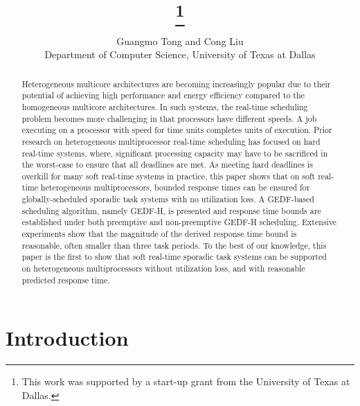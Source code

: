 \documentclass[Times, 10pt,twocolumn]{article}
\theoremstyle{definition}
\begin{document}
  

\title{\protect\vspace{-.5in}{Supporting Soft Real-Time Sporadic Task Systems on Heterogeneous Multiprocessors with No Utilization Loss}\thanks{This work was supported by a start-up
grant from the University of Texas at Dallas.}}
\author{Guangmo Tong and Cong Liu\\
Department of Computer Science, University of Texas at Dallas}

\maketitle
\thispagestyle{empty}



\begin{abstract}

Heterogeneous multicore architectures are becoming increasingly popular due to their potential of achieving high performance and energy efficiency compared to the homogeneous multicore architectures. In such systems, the real-time scheduling problem becomes more challenging in that processors have different speeds. A job executing on a processor with speed  for  time units completes  units of execution. Prior research on heterogeneous multiprocessor real-time scheduling has focused on hard real-time systems, where, significant processing capacity may have to be sacrificed in the worst-case to ensure that all deadlines are met. As meeting hard deadlines is overkill for many soft real-time systems in practice, this paper shows that on soft real-time heterogeneous multiprocessors, bounded response times can be ensured for globally-scheduled sporadic task systems with no utilization loss. A GEDF-based scheduling algorithm, namely GEDF-H, is presented and response time bounds are established under both preemptive and non-preemptive GEDF-H scheduling. Extensive experiments show that  the magnitude of the derived response time bound is reasonable, often smaller than three task periods. To the best of our knowledge, this paper is the first to show that soft real-time sporadic task systems can be supported on heterogeneous multiprocessors without utilization loss, and with reasonable predicted response time.

\end{abstract}

\section{Introduction}
\label{sec:intro}
\end{document}
